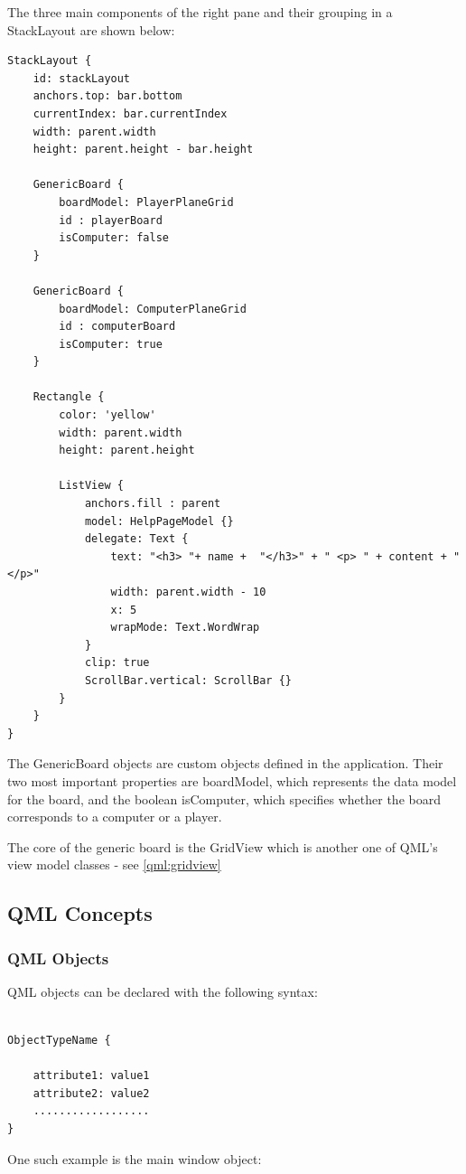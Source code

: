 The three main components of the right pane and their grouping in a StackLayout are shown below:

\begin{lstlisting}
StackLayout {
	id: stackLayout
	anchors.top: bar.bottom
	currentIndex: bar.currentIndex
	width: parent.width
	height: parent.height - bar.height
	
	GenericBoard {
		boardModel: PlayerPlaneGrid
		id : playerBoard
		isComputer: false
	}
	
	GenericBoard {
		boardModel: ComputerPlaneGrid
		id : computerBoard
		isComputer: true
	}
	
	Rectangle {
		color: 'yellow'
		width: parent.width
		height: parent.height
		
		ListView {
			anchors.fill : parent 
			model: HelpPageModel {}
			delegate: Text {
				text: "<h3> "+ name +  "</h3>" + " <p> " + content + " </p>"
				width: parent.width - 10
				x: 5
				wrapMode: Text.WordWrap
			}
			clip: true
			ScrollBar.vertical: ScrollBar {}
		}
	}
}
\end{lstlisting}

The GenericBoard objects are custom objects defined in the application. Their two most important properties are boardModel, which represents the data model for the board, and the boolean isComputer, which specifies whether the board corresponds to a computer or a player.

The core of the generic board is the GridView which is another one of QML's view model classes - see \ref{qml:gridview}


\subsection {QML Concepts}

\subsubsection {QML Objects}

QML objects can be declared with the following syntax: 

\begin{lstlisting}

ObjectTypeName {

	attribute1: value1
	attribute2: value2
	..................
}

\end{lstlisting}

One such example is the main window object:

